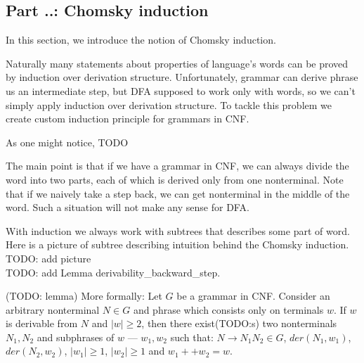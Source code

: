 \subsection{Part ..: Chomsky induction}

In this section, we introduce the notion of Chomsky induction.

Naturally many statements about properties of language's words can be proved by induction over derivation structure. Unfortunately, grammar can derive phrase us an intermediate step, but DFA supposed to work only with words, so we can’t simply apply induction over derivation structure. To tackle this problem we create custom induction principle for grammars in CNF.

As one might notice, TODO




The main point is that if we have a grammar in CNF, we can always divide the word into two parts, each of which is derived only from one nonterminal. Note that if we naively take a step back, we can get nonterminal in the middle of the word. Such a situation will not make any sense for DFA.

With induction we always work with subtrees that describes some part of word. Here is a picture of subtree describing intuition behind the Chomsky induction. \\
TODO: add picture\\ 
TODO: add Lemma derivability\_backward\_step.


(TODO: lemma)
More formally: 
Let $G$ be a grammar in CNF. Consider an arbitrary nonterminal $N \in G$ and phrase which consists only on terminals $w$. 
If $w$ is derivable from $N$ and $|w| \ge 2$, then there exist(TODO:s) two nonterminals $N_1, N_2$ and subphrases of $w$ --- $w_1, w_2$ such that: $N \to N_1 N_2 \in G$, $der(N_1, w_1)$, $der(N_2, w_2)$, $|w_1| \ge 1$, $|w_2| \ge 1$ and $w_1 ++ w_2 = w$.

